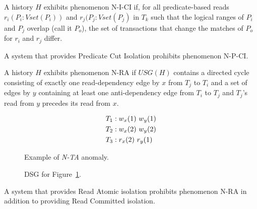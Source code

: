 \begin{definition}
A history $H$ exhibits phenomenon N-I-CI if, for all predicate-based
reads $r_i(P_i:Vset(P_i))$ and $r_j(P_j:Vset(P_j)$ in $T_k$ such that
the logical ranges of $P_i$ and $P_j$ overlap (call it $P_o$), the set
of transactions that change the matches of $P_o$ for $r_i$ and $r_j$
differ.
\end{definition}

\begin{definition}
A system that provides Predicate Cut Isolation prohibits phenomenon N-P-CI.
\end{definition}

\begin{definition}
A history $H$ exhibits phenomenon N-RA if $USG(H)$ contains a directed
cycle consisting of exactly one read-dependency edge by $x$ from $T_j$
to $T_i$ and a set of edges by $y$ containing at least one
anti-dependency edge from $T_i$ to $T_j$ and $T_j$'s read from $y$
precedes its read from $x$.
\end{definition}


\begin{figure}[H]
\begin{align*}
\small
T_1 &: w_x(1)~w_y(1)\\
T_2 &: w_x(2)~w_y(2)\\
T_3 &: r_x(2)~r_y(1)
\end{align*}
\caption{Example of \textit{N-TA} anomaly.}
\label{fig:nta-history}
\end{figure}

\begin{figure}[H]
\centering
{}
\caption{DSG for Figure~\ref{fig:nta-history}.}
\label{fig:nta-dsg}
\end{figure}

\begin{definition}
A system that provides Read Atomic isolation prohibits phenomenon
N-RA in addition to providing Read Committed isolation.
\end{definition}

